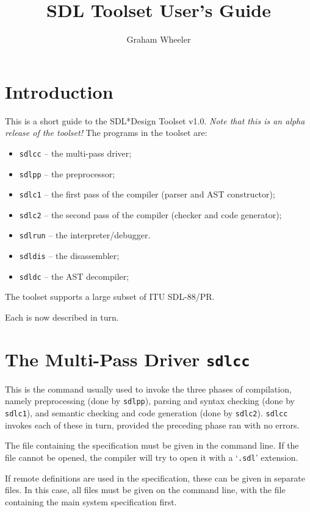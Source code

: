 
\author{Graham Wheeler}
\title{SDL Toolset User's Guide}
\maketitle

\section{Introduction}

This is a short guide to the SDL*Design Toolset v1.0.
{\em Note that this is an alpha release of the toolset!}
The programs in the toolset are:

\begin{itemize}
\item {\tt sdlcc} -- the multi-pass driver;
\item {\tt sdlpp} -- the preprocessor;
\item {\tt sdlc1} -- the first pass of the compiler (parser and AST
constructor);
\item {\tt sdlc2} -- the second pass of the compiler (checker and code
generator);
\item {\tt sdlrun} -- the interpreter/debugger.
\item {\tt sdldis} -- the disassembler;
\item {\tt sdldc} -- the AST decompiler;
\end{itemize}

The toolset supports a large subset of ITU SDL-88/PR.

Each is now described in turn.

\section{The Multi-Pass Driver {\tt sdlcc}}

This is the command usually used to invoke the three phases of
compilation, namely preprocessing (done by {\tt sdlpp}),
parsing and syntax checking (done by {\tt sdlc1}), and semantic 
checking and code generation (done by {\tt sdlc2}).  {\tt sdlcc}
invokes each of these in turn, provided the preceding phase
ran with no errors.

The file containing the specification must be given in the command
line. If the file cannot be opened, the compiler will try to open it
with a `{\tt .sdl}' extension. 

If remote definitions are used in the specification, these can
be given in separate files. In this case, all files must be given on
the command line, with the file containing the main system
specification first.

